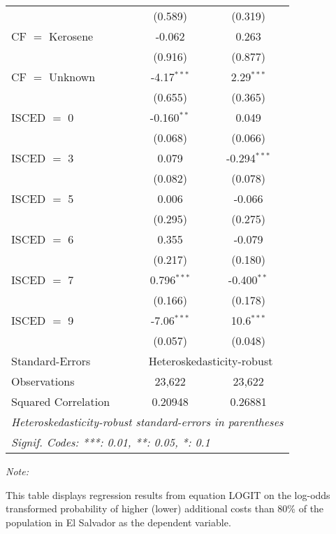 \begin{table}[htbp!]
\begin{adjustbox}{width = 1\textwidth, max height = 0.95\textheight, center}
\begin{threeparttable}[b]
\begin{tabular}{lcc}
                                 & (0.589)       & (0.319)\\   
            CF $=$ Kerosene      & -0.062        & 0.263\\   
                                 & (0.916)       & (0.877)\\   
            CF $=$ Unknown       & -4.17$^{***}$ & 2.29$^{***}$\\   
                                 & (0.655)       & (0.365)\\   
            ISCED $=$ 0          & -0.160$^{**}$ & 0.049\\   
                                 & (0.068)       & (0.066)\\   
            ISCED $=$ 3          & 0.079         & -0.294$^{***}$\\   
                                 & (0.082)       & (0.078)\\   
            ISCED $=$ 5          & 0.006         & -0.066\\   
                                 & (0.295)       & (0.275)\\   
            ISCED $=$ 6          & 0.355         & -0.079\\   
                                 & (0.217)       & (0.180)\\   
            ISCED $=$ 7          & 0.796$^{***}$ & -0.400$^{**}$\\   
                                 & (0.166)       & (0.178)\\   
            ISCED $=$ 9          & -7.06$^{***}$ & 10.6$^{***}$\\   
                                 & (0.057)       & (0.048)\\   
            \midrule 
            Standard-Errors & \multicolumn{2}{c}{Heteroskedasticity-robust} \\ 
            Observations         & 23,622        & 23,622\\  
            Squared Correlation  & 0.20948       & 0.26881\\  
            \midrule \midrule
            \multicolumn{3}{l}{\emph{Heteroskedasticity-robust standard-errors in parentheses}}\\
            \multicolumn{3}{l}{\emph{Signif. Codes: ***: 0.01, **: 0.05, *: 0.1}}\\
         \end{tabular}
         
         \begin{tablenotes}\item \medskip \textit{Note:}
            \item This table displays regression results from equation LOGIT on the log-odds transformed probability of higher (lower) additional costs than 80\% of the population in El Salvador as the dependent variable. 
         \end{tablenotes}
      \end{threeparttable}
   \end{adjustbox}
\end{table}


